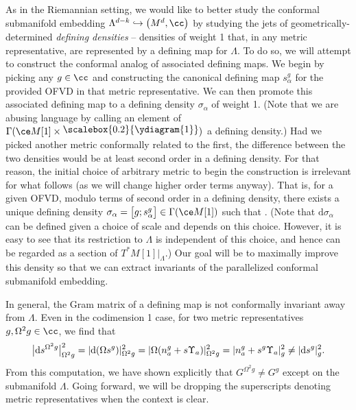 As in the Riemannian setting, we would like to better study the conformal submanifold embedding $\Lambda^{d-k} \hookrightarrow \bigl(M^d,\cc\bigr)$ by studying the jets of geometrically-determined \textit{defining densities} -- densities of weight 1 that, in any metric representative, are represented by a defining map for $\Lambda$. To do so, we will attempt to construct the conformal analog of associated defining maps. We begin by picking any $g \in \cc$ and constructing the canonical defining map $s_{\alpha}^g$ for the provided OFVD in that metric representative. We can then promote this associated defining map to a defining density $\sigma_{\alpha}$ of weight 1. (Note that we are abusing language by calling an element of $\Gamma(\ce M[1] \times \raisebox{2pt}{\scalebox{0.2}{\ydiagram{1}}})$ a defining density.) Had we picked another metric conformally related to the first, the difference between the two densities would be at least second order in a defining density. For that reason, the initial choice of arbitrary metric to begin the construction is irrelevant for what follows (as we will change higher order terms anyway). That is, for a given OFVD, modulo terms of second order in a defining density, there exists a unique defining density $\sigma_{\alpha} = \bigl[g; s^g_{\alpha}\bigr] \in \Gamma(\ce M[1])$ such that . (Note that $\mathrm{d} \sigma_{\alpha}$ can be defined given a choice of scale and depends on this choice. However, it is easy to see that its restriction to $\Lambda$ is independent of this choice, and hence can be regarded as a section of $T^*M[1]|_{\Lambda}$.) Our goal will be to maximally improve this density so that we can extract invariants of the parallelized conformal submanifold embedding.

In general, the Gram matrix of a defining map is not conformally invariant away from $\Lambda$. Even in the codimension 1 case, for two metric representatives $g, \Omega^2 g \in \cc$, we find that
\[\bigl|{\rm d} s^{\Omega^2 g}\bigr|^2_{\Omega^2 g} = |{\rm d} (\Omega s^g)|^2_{\Omega^2 g} = |\Omega (n^g_a + s \Upsilon_a)|^2_{\Omega^2 g} = |n^g_a + s^g \Upsilon_a|^2_g \neq |{\rm d}s^g|^2_g .\]
From this computation, we have shown explicitly that $G^{\Omega^2 g} \neq G^g$ except on the submanifold $\Lambda$. Going forward, we will be dropping the superscripts denoting metric representatives when the context is clear.

